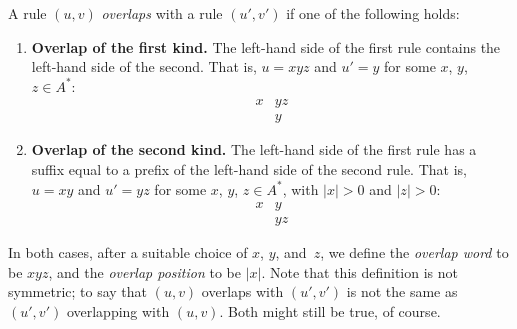 \documentclass[../generics]{subfiles}
\begin{document}
\begin{definition}\label{overlappingrules}
A rule $(u, v)$ \emph{overlaps} with a rule $(u', v')$ if one of the following holds:
\begin{enumerate}
\item \textbf{Overlap of the first kind.} The left-hand side of the first rule contains the left-hand side of the second. That is, $u=xyz$ and $u'=y$ for some $x$, $y$, $z\in A^*$:
\begin{align*}
x&yz\\
&y
\end{align*}
\item \textbf{Overlap of the second kind.} The left-hand side of the first rule has a suffix equal to a prefix of the left-hand side of the second rule. That is, $u=xy$ and $u'=yz$ for some $x$, $y$, $z\in A^*$, with $|x|>0$ and $|z|>0$:
\begin{align*}
x&y\\
&yz
\end{align*}
\end{enumerate}
In both cases, after a suitable choice of $x$, $y$, and~$z$, we define the \emph{overlap word} to be $xyz$, and the \emph{overlap position} to be $|x|$. Note that this definition is not symmetric; to say that $(u, v)$ overlaps with $(u', v')$ is not the same as $(u', v')$ overlapping with $(u, v)$. Both might still be true, of course.
\end{definition}
\end{document}
